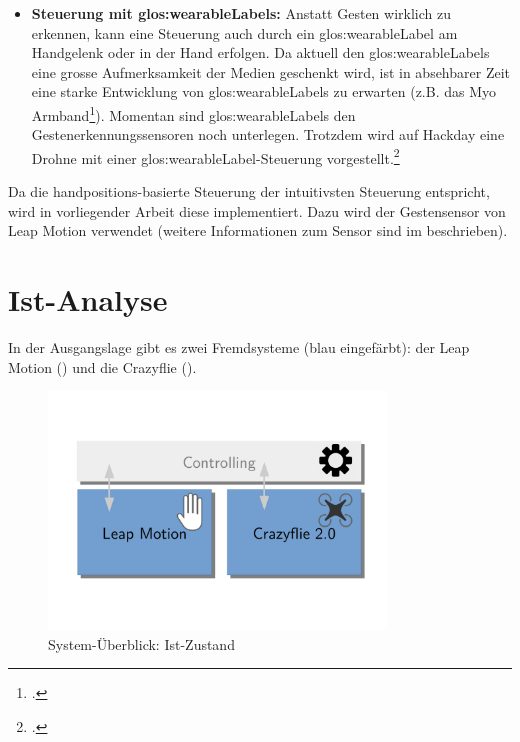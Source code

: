 \begin{itemize}
	\item \textbf{Steuerung mit \glspl{glos:wearableLabel}:}
	Anstatt Gesten wirklich zu erkennen, kann eine Steuerung auch durch ein \gls{glos:wearableLabel} am Handgelenk oder in der Hand erfolgen.
	Da aktuell den \glspl{glos:wearableLabel} eine grosse Aufmerksamkeit der Medien geschenkt wird, ist in absehbarer Zeit eine starke Entwicklung von \glspl{glos:wearableLabel} zu erwarten (z.B. das Myo Armband\footcite{Myo_Gesture_Control_Armband_-_Wearable_Technology_by_Thalmic_Labs_2015-08-28}).
	Momentan sind \glspl{glos:wearableLabel} den Gestenerkennungssensoren noch unterlegen.
	Trotzdem wird auf Hackday eine Drohne mit einer \gls{glos:wearableLabel}-Steuerung vorgestellt.\footcite{Wearable_Gesture_Controlled_Drone_Hackaday_2015-04-29}
\end{itemize}

Da die handpositions-basierte Steuerung der intuitivsten Steuerung entspricht, wird in vorliegender Arbeit diese implementiert.
Dazu wird der Gestensensor von Leap Motion verwendet (weitere Informationen zum Sensor sind im  beschrieben).


\clearpage %
\section{Ist-Analyse}

In der Ausgangslage gibt es zwei Fremdsysteme (blau eingefärbt): der Leap Motion () und die Crazyflie ().

\begin{figure}[H]
	\centering
	\includegraphics[width=0.8\textwidth]{figures/system_is.pdf}
	\caption{System-Überblick: Ist-Zustand}
\end{figure}

